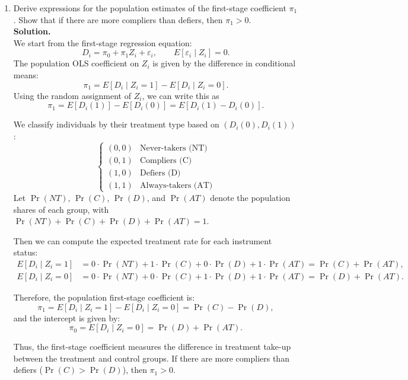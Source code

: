 \documentclass[12pt]{article}
\begin{document}
\begin{enumerate}[label=\textbf{(\alph*)}, leftmargin=1.5em]
  \item Derive expressions for the population estimates of the first-stage coefficient $\pi_1$. Show that if there are more compliers than defiers, then $\pi_1>0$.\\[0.5em]
  
  \textbf{Solution.} \\
  We start from the first-stage regression equation:
    \[
    D_i = \pi_0 + \pi_1 Z_i + \varepsilon_i, \qquad E[\varepsilon_i \mid Z_i] = 0.
    \]
    The population OLS coefficient on $Z_i$ is given by the difference in conditional means:
    \[
    \pi_1 = E[D_i \mid Z_i = 1] - E[D_i \mid Z_i = 0].
    \]
    Using the random assignment of $Z_i$, we can write this as
    \[
    \pi_1 = E[D_i(1)] - E[D_i(0)] = E[D_i(1) - D_i(0)].
    \]

    We classify individuals by their treatment type based on $(D_i(0), D_i(1))$:
    \[
    \begin{cases}
    (0,0) & \text{Never-takers (NT)} \\
    (0,1) & \text{Compliers (C)} \\
    (1,0) & \text{Defiers (D)} \\
    (1,1) & \text{Always-takers (AT)}
    \end{cases}
    \]
    Let $\Pr(NT)$, $\Pr(C)$, $\Pr(D)$, and $\Pr(AT)$ denote the population shares of each group, with
    $\Pr(NT) + \Pr(C) + \Pr(D) + \Pr(AT) = 1$.

    Then we can compute the expected treatment rate for each instrument status:
    \[
    \begin{aligned}
    E[D_i \mid Z_i = 1] &= 0 \cdot \Pr(NT) + 1 \cdot \Pr(C) + 0 \cdot \Pr(D) + 1 \cdot \Pr(AT)
    = \Pr(C) + \Pr(AT), \\
    E[D_i \mid Z_i = 0] &= 0 \cdot \Pr(NT) + 0 \cdot \Pr(C) + 1 \cdot \Pr(D) + 1 \cdot \Pr(AT)
    = \Pr(D) + \Pr(AT).
    \end{aligned}
    \]

    Therefore, the population first-stage coefficient is:
    \[
    \pi_1 = E[D_i \mid Z_i = 1] - E[D_i \mid Z_i = 0] = \Pr(C) - \Pr(D),
    \]
    and the intercept is given by:
    \[
    \pi_0 = E[D_i \mid Z_i = 0] = \Pr(D) + \Pr(AT).
    \]

  Thus, the first-stage coefficient measures the difference in treatment take-up between the treatment and control groups. If there are more compliers than defiers ($\Pr(C) > \Pr(D)$), then $\pi_1 > 0$.


\end{enumerate}
\end{document}
